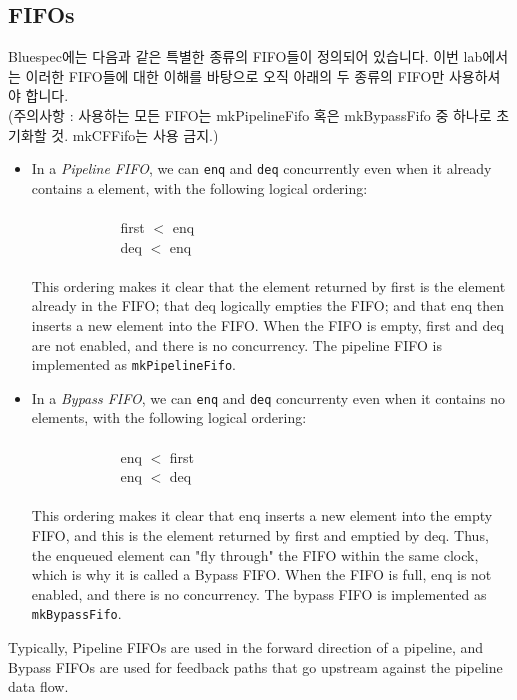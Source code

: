 \documentclass{article}
\begin{document}
\subsection{FIFOs}

Bluespec에는 다음과 같은 특별한 종류의 FIFO들이 정의되어 있습니다. 
이번 lab에서는 이러한 FIFO들에 대한 이해를 바탕으로 오직 아래의 두 종류의 FIFO만 사용하셔야 합니다.
\\(주의사항 : 사용하는 모든 FIFO는 mkPipelineFifo 혹은 mkBypassFifo 중 하나로 초기화할 것. mkCFFifo는 사용 금지.)


\begin{itemize}
\item In a \textit{Pipeline FIFO}, we can \texttt{enq} and \texttt{deq} concurrently even
when it already contains a element, with the following logical ordering:
\\\\$\phantom{123123123123}$ first $<$ enq
\\$\phantom{123123123123}$ deq $<$ enq\\\\
This ordering makes it clear that the element returned by first is the element already
in the FIFO; that deq logically empties the FIFO; and that enq then inserts a new
element into the FIFO. When the FIFO is empty, first and deq are not enabled, and
there is no concurrency. The pipeline FIFO is implemented as \texttt{mkPipelineFifo}.

\item In a \textit{Bypass FIFO}, we can \texttt{enq} and \texttt{deq} concurrenty even when it contains no elements,
with the following logical ordering:
\\\\$\phantom{123123123123}$ enq $<$ first
\\$\phantom{123123123123}$ enq $<$ deq\\\\
This ordering makes it clear that enq inserts a new element into the empty FIFO,
and this is the element returned by first and emptied by deq. Thus, the enqueued
element can "fly through" the FIFO within the same clock, which is why it is called a
Bypass FIFO. When the FIFO is full, enq is not enabled, and there is no concurrency.
The bypass FIFO is implemented as \texttt{mkBypassFifo}.
\end{itemize}

Typically, Pipeline FIFOs are used in the forward direction of a pipeline, and
Bypass FIFOs are used for feedback paths that go upstream against the pipeline data flow.
\end{document}
